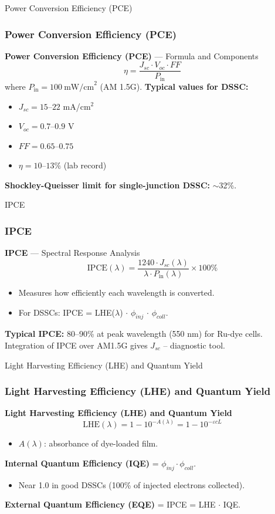 \documentclass[aspectratio=169]{beamer}
\begin{document}
\begin{frame}{Power Conversion Efficiency (PCE)}
\frametitle{Power Conversion Efficiency (PCE)}

\textbf{Power Conversion Efficiency (PCE)} — Formula and Components
\[
\eta = \frac{J_{sc} \cdot V_{oc} \cdot FF}{P_{\text{in}}}
\]
where $P_{\text{in}} = 100\ \text{mW/cm}^2$ (AM 1.5G).
\vspace{2mm}
\textbf{Typical values for DSSC:}
\begin{itemize}
\item $J_{sc} = 15–22$ mA/cm$^2$
\item $V_{oc} = 0.7–0.9$ V
\item $FF = 0.65–0.75$
\item $\eta = 10–13\%$ (lab record)
\end{itemize}
\textbf{Shockley-Queisser limit for single-junction DSSC:} $\sim$32\%.
\cite{Hagfeldt2010}
\end{frame}


\begin{frame}{IPCE}
\frametitle{IPCE}

\textbf{IPCE} — Spectral Response Analysis
\[
\text{IPCE}(\lambda) = \frac{1240 \cdot J_{sc}(\lambda)}{\lambda \cdot P_{\text{in}}(\lambda)} \times 100\%
\]
\begin{itemize}
\item Measures how efficiently each wavelength is converted.
\item For DSSCs: IPCE = LHE($\lambda$) $\cdot$ $\phi_{inj}$ $\cdot$ $\phi_{coll}$.
\end{itemize}
\textbf{Typical IPCE:} 80–90\% at peak wavelength (550 nm) for Ru-dye cells.
\vspace{2mm}
Integration of IPCE over AM1.5G gives $J_{sc}$ – diagnostic tool.
\cite{Snaith2005}
\end{frame}


\begin{frame}{Light Harvesting Efficiency (LHE) and Quantum Yield}
\frametitle{Light Harvesting Efficiency (LHE) and Quantum Yield}

\textbf{Light Harvesting Efficiency (LHE) and Quantum Yield}
\[
\text{LHE}(\lambda) = 1 - 10^{-A(\lambda)} = 1 - 10^{-\varepsilon c L}
\]
\begin{itemize}
\item $A(\lambda)$: absorbance of dye-loaded film.
\end{itemize}
\textbf{Internal Quantum Efficiency (IQE)} = $\phi_{inj} \cdot \phi_{coll}$.
\begin{itemize}
\item Near 1.0 in good DSSCs (100\% of injected electrons collected).
\end{itemize}
\textbf{External Quantum Efficiency (EQE)} = IPCE = LHE $\cdot$ IQE.
\cite{Hagfeldt2008}
\end{frame}
\end{document}
